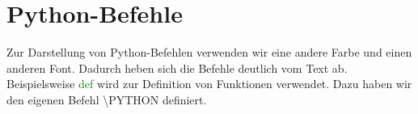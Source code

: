 \documentclass[12pt,a4paper]{scrbook}
\newcommand{\PYTHON}[1]{\textcolor{green}{\ttfamily #1}}
\begin{document}
\chapter{Python-Befehle}

Zur Darstellung von Python-Befehlen verwenden wir eine andere Farbe und einen anderen Font. 
Dadurch heben sich die Befehle deutlich vom Text ab. 
Beispielsweise \PYTHON{def} wird zur Definition von Funktionen verwendet. 
Dazu haben wir den eigenen Befehl {\ttfamily \textbackslash PYTHON} definiert.
\end{document}
